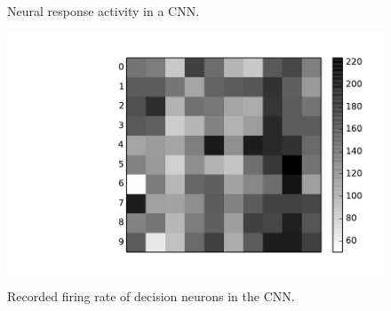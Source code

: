 \documentclass[runningheads,a4paper]{llncs}
\begin{document}
\begin{figure}[bt!]
	\caption{
	Neural response activity in a CNN.}
	\label{fig:cnn}
\end{figure}

\begin{figure}[bt!]
	\centering
	\includegraphics[height=0.5\textwidth]{pic/7.pdf}
	\caption{
	Recorded firing rate of decision neurons in the CNN.}
	\label{fig:result}	
\end{figure}
\end{document}
